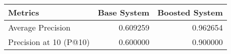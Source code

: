\begin{tabular}{lrr}
\toprule
               Metrics &  Base System &  Boosted System \\
\midrule
     Average Precision &     0.609259 &        0.962654 \\
Precision at 10 (P@10) &     0.600000 &        0.900000 \\
\bottomrule
\end{tabular}
